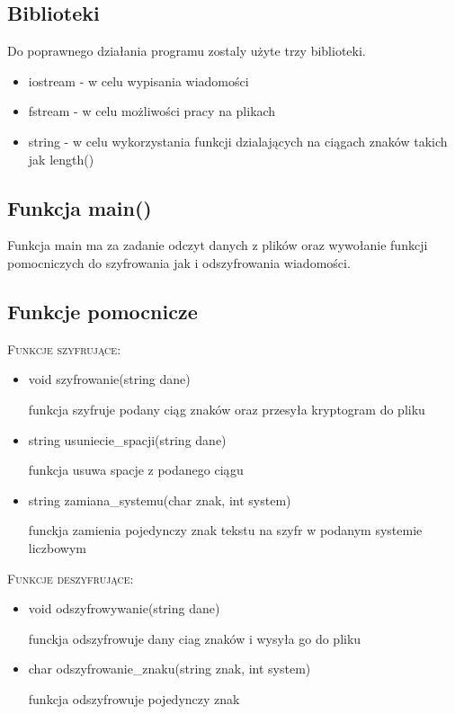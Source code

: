 \documentclass{article}
\begin{document}
\subsection{Biblioteki}
Do poprawnego działania programu zostaly użyte trzy biblioteki.

\begin{itemize}
\item iostream - w celu wypisania wiadomości
\item fstream - w celu możliwości pracy na plikach
\item string - w celu wykorzystania funkcji dzialających na ciągach znaków takich jak length()
\end{itemize}

\subsection{Funkcja main()}
Funkcja main ma za zadanie odczyt danych z plików oraz wywołanie funkcji pomocniczych do szyfrowania jak i odszyfrowania wiadomości.

\subsection{Funkcje pomocnicze}
\textsc{\large Funkcje szyfrujące:}

\begin{itemize}
\item void szyfrowanie(string dane)

funkcja szyfruje podany ciąg znaków oraz przesyła kryptogram do pliku
\item string usuniecie\_spacji(string dane)

funkcja usuwa spacje z podanego ciągu
\item string zamiana\_systemu(char znak, int system)

funckja zamienia pojedynczy znak tekstu na szyfr w podanym systemie liczbowym
\end{itemize}


\textsc{\large Funkcje deszyfrujące:}

\begin{itemize}
\item void odszyfrowywanie(string dane)

funckja odszyfrowuje dany ciag znaków i wysyła go do pliku
\item char odszyfrowanie\_znaku(string znak, int system)

funkcja odszyfrowuje pojedynczy znak
\end{itemize}
\end{document}
